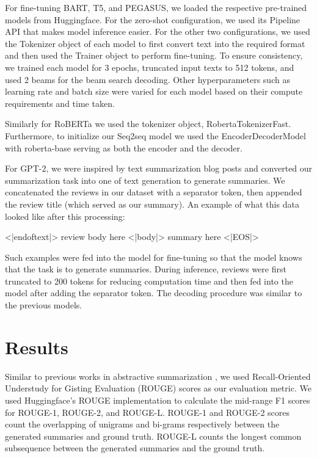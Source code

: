 \documentclass{article}
\begin{document}
For fine-tuning BART, T5, and PEGASUS, we loaded the respective pre-trained models from Huggingface. For the zero-shot configuration, we used its Pipeline API \cite{Pipeline} that makes model inference easier. For the other two configurations, we used the Tokenizer object of each model to first convert text into the required format and then used the Trainer object to perform fine-tuning. To ensure consistency, we trained each model for 3 epochs, truncated input texts to 512 tokens, and used 2 beams for the beam search decoding.  Other hyperparameters such as learning rate and batch size were varied for each model based on their compute requirements and time taken. 

Similarly for RoBERTa we used the tokenizer object, RobertaTokenizerFast. Furthermore, to initialize our Seq2seq model we used the EncoderDecoderModel with roberta-base serving as both the encoder and the decoder.

For GPT-2, we were inspired by text summarization blog posts \cite{gptblog} and converted our summarization task into one of text generation to generate summaries. We concatenated the reviews in our dataset with a separator token, then appended the review title (which served as our summary). An example of what this data looked like after this processing:
\begin{center}
<|endoftext|> review body here <|body|> summary here <|EOS|>
\end{center}
Such examples were fed into the model for fine-tuning so that the model knows that the task is to generate summaries. During inference, reviews were first truncated to 200 tokens for reducing computation time and then fed into the model after adding the separator token. The decoding procedure was similar to the previous models.

\section{Results}
Similar to previous works in abstractive summarization \cite{kassasSurvey,newsSummarization, t5abstractive} , we used Recall-Oriented Understudy for Gisting Evaluation (ROUGE) scores as our evaluation metric. We used Huggingface’s ROUGE implementation to calculate the mid-range F1 scores for ROUGE-1, ROUGE-2, and ROUGE-L. ROUGE-1 and ROUGE-2 scores count the overlapping of unigrams and bi-grams respectively between the generated summaries and ground truth. ROUGE-L counts the longest common subsequence between the generated summaries and the ground truth.
\end{document}
